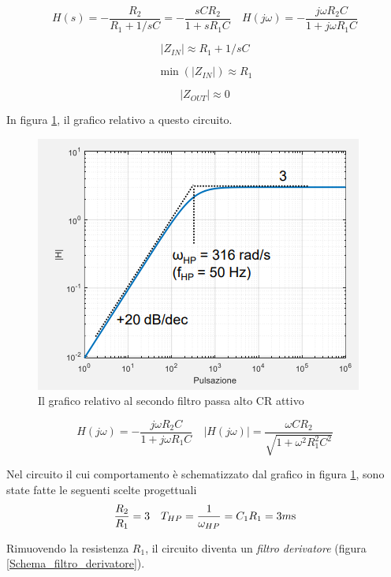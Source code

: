 \documentclass{article}
\begin{document}
\[H(s) = - \frac{R_2}{R_1 + 1/sC} = -  \frac{sCR_2}{1 + sR_1 C} \quad H(j \omega) = - \frac{j \omega R_2 C}{1 + j \omega R_1 C}\]

\[|Z_{IN}| \approx R_1 + 1/sC\]

\[\min (|Z_{IN}|) \approx R_1\]

\[|Z_{OUT}| \approx 0\]

In figura \ref{Schema_filtro_passa_alto_CR_attivo_grafici}, il grafico relativo a questo circuito.

\begin{figure}[h]
  \centering
  \includegraphics[scale=0.6]{IM_filtro_passa_alto_CR_attivo_grafici}
  \caption{Il grafico relativo al secondo filtro passa alto CR attivo}
  \label{Schema_filtro_passa_alto_CR_attivo_grafici}
\end{figure}

\[H(j \omega) = - \frac{j \omega R_2 C}{1 + j \omega R_1 C} \quad |H(j \omega)| = \frac{\omega C R_2}{\sqrt{1 + \omega ^2 R^2_1 C^2}}\]

Nel circuito il cui comportamento è schematizzato dal grafico in figura \ref{Schema_filtro_passa_alto_CR_attivo_grafici}, sono state fatte le seguenti scelte progettuali
\begin{align*}
\frac{R_2}{R_1} = 3 && T_{HP} = \frac{1}{\omega _{HP}} = C_1 R_1 = 3 m \textrm s
\end{align*}  
\clearpage

Rimuovendo la resistenza $R_1$, il circuito diventa un \textit{filtro derivatore} (figura \ref{Schema_filtro_derivatore}).
\end{document}

